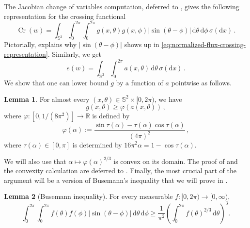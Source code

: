 \documentclass[reqno, 11pt]{amsart}
\theoremstyle{definition}
\newtheorem{lemma}{Lemma}
\newcommand{\abs}[1]{\left\lvert#1\right\rvert}
\newcommand{\dd}{\mathrm{d}}
\begin{document}
The Jacobian change of variables computation, deferred to , gives the following representation for the crossing functional
\begin{equation}\label{eq:normalized-flux-crossing-representation}
        \operatorname{Cr}(w)=
        \int_{{\mathbb S}^2}\int_0^{2\pi}\int_0^{2\pi}
        g(x,\theta)g(x,\phi)\abs{\sin(\theta-\phi)}
        \,\dd\theta\,\dd\phi\,\sigma(\dd x)\,.
\end{equation}
Pictorially,  explains why $|\sin(\theta - \phi)|$ shows up in \eqref{eq:normalized-flux-crossing-representation}. Similarly, we get  
\begin{equation}\label{eq:normalized-incidence-identity}
       e(w)= \int_{{\mathbb S}^2}\int_0^{2\pi}a(x,\theta)\,\dd\theta\,\sigma(\dd x)\,.
\end{equation}
We show that one can lower bound $g$ by a function of $a$ pointwise as follows.
\begin{lemma}\label{lem:normalized-bathtub-main}
For almost every \((x,\theta) \in {\mathbb S}^2 \times [0, 2\pi)\), we have 
\begin{equation}\label{eq:normalized-pointwise-bathtub}
    g(x,\theta) \geq \varphi (a (x,\theta))\,,
\end{equation}
where $\varphi : [0,1/(8\pi^2)] \to {\mathbb R}$ is defined by 
\begin{equation}\label{eq:normalized-bathtub-profile}
        \varphi(\alpha):=
        \frac{\sin \tau(\alpha)-\tau(\alpha)\cos \tau(\alpha)}{(4\pi)^2}\,,
\end{equation}
where $\tau(\alpha) \in [0,\pi]$ is determined by $16\pi^2 \alpha =1-\cos  \tau(\alpha).$
\end{lemma}

We will also use that $\alpha \mapsto  \varphi(\alpha)^{2/3}$ is convex on its domain. The proof of  and the convexity calculation are deferred to . Finally, the most crucial part of the argument will be a version of Busemann's inequality that we will prove in .

\begin{lemma}[Busemann inequality]\label{lem:busemann-circle-main}
For every measurable \(f:[0,2\pi)\to[0,\infty)\),
\begin{equation}\label{eq:busemann-circle-main}
        \int_0^{2\pi}\int_0^{2\pi}
        f(\theta)f(\phi)\abs{\sin(\theta-\phi)}
        \,\dd\theta\,\dd\phi
        \ge
        \frac1{\pi^2}
        \left(\int_0^{2\pi}f(\theta)^{2/3}\,\dd\theta\right)^3.
\end{equation}
\end{lemma}
\end{document}
